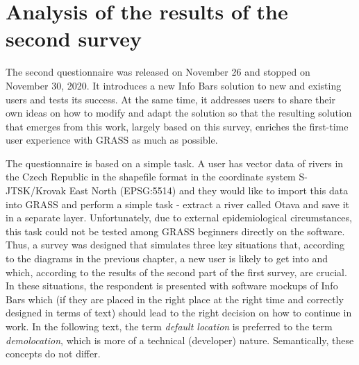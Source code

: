 \documentclass[a4paper,10pt,twoside]{article}
\begin{document}

\newpage
\vspace*{-1cm}
\section{Analysis of the results of the second survey}
\label{sec:qstat2}

\noindent The second questionnaire was released on November 26 and stopped on November 30, 2020. It introduces a new Info Bars solution to new and existing users and tests its success. At the same time, it addresses users to share their own ideas on how to modify and adapt the solution so that the resulting solution that emerges from this work, largely based on this survey, enriches the first-time user experience with GRASS as much as possible.

The questionnaire is based on a simple task. A user has vector data of rivers in the Czech Republic in the shapefile format in the coordinate system S-JTSK/Krovak East North (EPSG:5514) and they would like to import this data into GRASS and perform a simple task - extract a river called Otava and save it in a separate layer. Unfortunately, due to external epidemiological circumstances, this task could not be tested among GRASS beginners directly on the software. Thus, a survey was designed that simulates three key situations that, according to the diagrams in the previous chapter, a new user is likely to get into and which, according to the results of the second part of the first survey, are crucial. In these situations, the respondent is presented with software mockups of Info Bars which (if they are placed in the right place at the right time and correctly designed in terms of text) should lead to the right decision on how to continue in work. In the following text, the term \textit{default location} is preferred to the term \textit{demolocation}, which is more of a technical (developer) nature. Semantically, these concepts do not differ.
\end{document}
